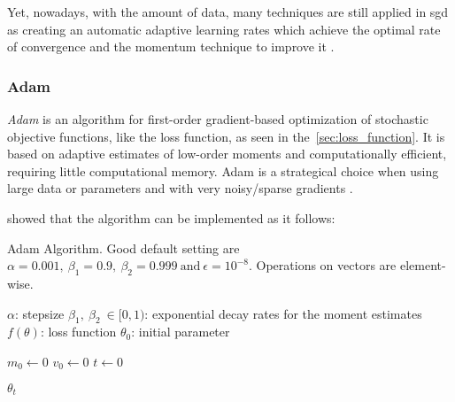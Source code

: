 Yet, nowadays, with the amount of data, many techniques are still applied in \gls*{sgd} as creating an automatic adaptive learning rates which achieve the optimal rate of convergence \citep{darken1991} and the momentum technique to improve it \citep{sutskever2013}.

\subsubsection*{Adam}

\emph{Adam} is an algorithm for first-order gradient-based optimization of stochastic objective functions, like the loss function, as seen in the~\cref{sec:loss_function}.
It is based on adaptive estimates of low-order moments and computationally efficient, requiring little computational memory.
Adam is a strategical choice when using large data or parameters and with very noisy/sparse gradients \citep{kingma2017}.

\citet{kingma2017} showed that the algorithm can be implemented as it follows:

\begin{algorithm}
\caption[Adam Algorithm]{Adam Algorithm. Good default setting are \(\alpha = 0.001,\ \beta_1 = 0.9,\ \beta_2 = 0.999\ \text{and}\ \epsilon = 10^{-8}\). Operations on vectors are element-wise.}
\begin{algorithmic}
\Require \(\alpha\): stepsize
\Require \(\beta_1,\ \beta_2\ \in [0,1)\): exponential decay rates for the moment estimates
\Require \(f(\theta)\): loss function
\Require \(\theta_0\): initial parameter

\State \(m_0 \gets 0\)
\State \(v_0 \gets 0\)
\State \(t \gets 0\)
\EndWhile

\Return \(\theta_t\)
\end{algorithmic}
\end{algorithm}



